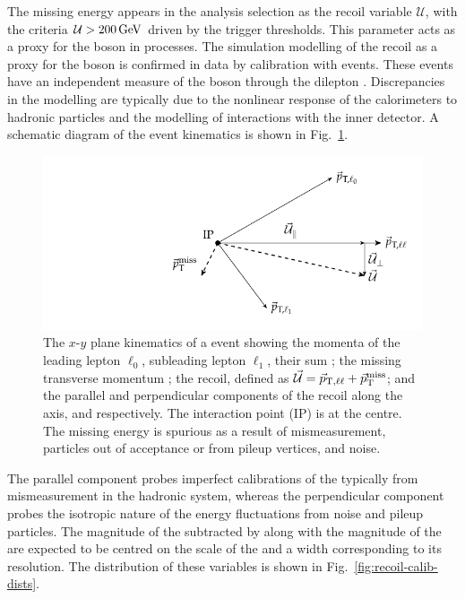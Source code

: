 The missing energy appears in the analysis selection as the recoil variable $\mathcal{U}$, with the criteria ${\mathcal{U}>\SI{200}{GeV}}$ driven by the trigger thresholds. This parameter acts as a proxy for the boson \pt in \IVj processes. The simulation modelling of the recoil as a proxy for the boson \pt is confirmed in data by calibration with \diellplusjets events. These events have an independent measure of the boson \pt through the dilepton \pt. Discrepancies in the modelling are typically due to the nonlinear response of the calorimeters to hadronic particles and the modelling of interactions with the inner detector. A schematic diagram of the event kinematics is shown in Fig.~\ref{fig:recoil-calib-diagram}.

\begin{figure}[htb]
    \centering
    \includegraphics{diagrams/tikz/recoil_calib/recoil_calib.pdf}
    \caption[Kinematics diagram of a \IDYllj events.]{
        The $x$-$y$ plane kinematics of a \IDYllj event showing the momenta of the leading lepton $\ell_0$, subleading lepton $\ell_1$, their sum \vecptll; the missing transverse momentum \vecptmiss; the recoil, defined as $\vec{\mathcal{U}}=\vec{p}_{\mathrm{T},\ell\ell}+\vec{p}_{\text{T}}^{\mathrm{miss}}$; and the parallel and perpendicular components of the recoil along the \vecptll axis, \vecrecoilpara and \vecrecoilperp respectively. The interaction point (IP) is at the centre. The missing energy is spurious as a result of mismeasurement, particles out of acceptance or from pileup vertices, and noise.
    }
    \label{fig:recoil-calib-diagram}
\end{figure}

The parallel component \vecrecoilpara probes imperfect calibrations of the
\ptmiss typically from mismeasurement in the hadronic system, whereas the
perpendicular component \vecrecoilperp probes the isotropic nature of the
energy fluctuations from noise and pileup particles. The magnitude of the
\vecrecoilpara subtracted by \vecptll along with the magnitude of the
\vecrecoilperp are expected to be centred on the scale of the \ptmiss and a
width corresponding to its resolution. The distribution of these variables is
shown in Fig.~\ref{fig:recoil-calib-dists}.

